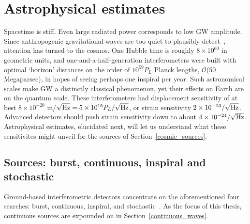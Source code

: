     \section{Astrophysical estimates}
    \label{estimates}

Spacetime is stiff.
Even large radiated power corresponds to low GW amplitude.
Since anthropogenic gravitational waves are too quiet to plausibly detect~\cite{Saulson}, attention has turned to the cosmos.
One Hubble time is roughly $8\times 10^{60}$ in geometric units, and one-and-a-half-generation interferometers were built with optimal `horizon' distances on the order of $10^{59} P_L$ Planck lengths, $\mathcal{O}$(50 Megaparsec), in hopes of seeing perhaps one inspiral per year.
Such astronomical scales make GW a distinctly classical phenomenon, yet their effects on Earth are on the quantum scale.
These interferometers had displacement sensitivity of at best $8\times 10^{-20}$ m/$\sqrt{\textup{Hz}} = 5\times10^{15} P_L/\sqrt{\textup{Hz}}$, or strain sensitivity $2\times10^{-23}/\sqrt{\textup{Hz}}$.
Advanced detectors should push strain sensitivity down to about $4\times10^{-24}/\sqrt{\textup{Hz}}$.
Astrophysical estimates, elucidated next, will let us understand what these sensitivites might unveil for the sources of Section~\ref{cosmic_sources}.


        \subsection{Sources: burst, continuous, inspiral and stochastic}
        \label{source_types}


Ground-based interferometric detectors concentrate on the aforementioned four searches: burst, continuous, inspiral, and stochastic~\cite{Riles2013}.
As the focus of this thesis, continuous sources are expounded on in Section~\ref{continuous_waves}.

